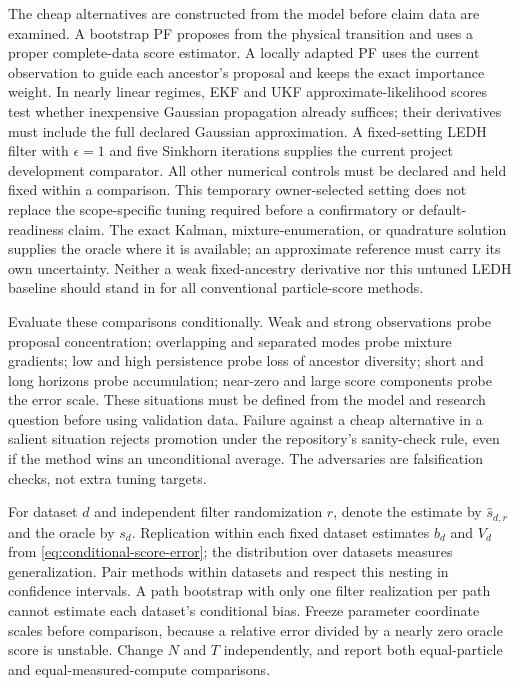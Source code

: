 \documentclass[11pt]{article}
\begin{document}
The cheap alternatives are constructed from the model before claim data are
examined. A bootstrap PF proposes from the physical transition and uses a
proper complete-data score estimator. A locally adapted PF uses the current
observation to guide each ancestor's proposal and keeps the exact importance
weight. In nearly linear regimes, EKF and UKF approximate-likelihood scores
test whether inexpensive Gaussian propagation already suffices; their
derivatives must include the full declared Gaussian approximation. A
fixed-setting LEDH filter with $\epsilon=1$ and five Sinkhorn iterations
supplies the current project development comparator. All other numerical
controls must be declared and held fixed within a comparison. This temporary
owner-selected setting does not replace the scope-specific tuning required
before a confirmatory or default-readiness claim. The exact Kalman,
mixture-enumeration, or quadrature solution supplies the oracle where it is
available; an approximate reference must carry its own uncertainty. Neither
a weak fixed-ancestry derivative nor this untuned LEDH baseline should stand
in for all conventional particle-score methods.

Evaluate these comparisons conditionally. Weak and strong observations probe
proposal concentration; overlapping and separated modes probe mixture
gradients; low and high persistence probe loss of ancestor diversity; short
and long horizons probe accumulation; near-zero and large score components
probe the error scale. These situations must be defined from the model and
research question before using validation data. Failure against a cheap
alternative in a salient situation rejects promotion under the repository's
sanity-check rule, even if the method wins an unconditional average. The
adversaries are falsification checks, not extra tuning targets.

For dataset $d$ and independent filter randomization $r$, denote the estimate
by $\widehat s_{d,r}$ and the oracle by $s_d$. Replication within each fixed
dataset estimates $b_d$ and $V_d$ from
\eqref{eq:conditional-score-error}; the distribution over datasets measures
generalization. Pair methods within datasets and respect this nesting in
confidence intervals. A path bootstrap with only one filter realization per
path cannot estimate each dataset's conditional bias. Freeze parameter
coordinate scales before comparison, because a relative error divided by a
nearly zero oracle score is unstable. Change $N$ and $T$ independently, and
report both equal-particle and equal-measured-compute comparisons.
\end{document}
